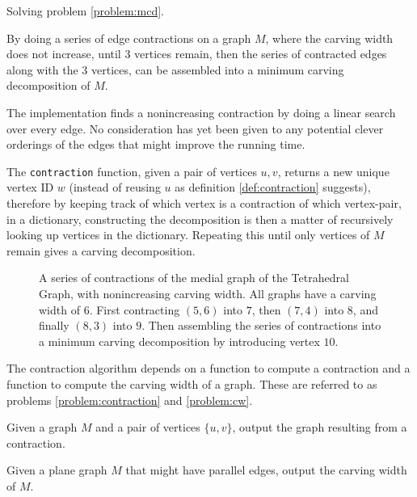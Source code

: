 \documentclass{article}
\begin{document}
		Solving problem \ref{problem:mcd}.

		By doing a series of edge contractions on a graph $M$, where the carving width does not increase, until 3 vertices remain, then the series of contracted edges along with the 3 vertices, can be assembled into a minimum carving decomposition of $M$.

		The implementation finds a nonincreasing contraction by doing a linear search over every edge. No consideration has yet been given to any potential clever orderings of the edges that might improve the running time.

		The \texttt{contraction} function, given a pair of vertices $u,v$, returns a new unique vertex ID $w$ (instead of reusing $u$ as definition \ref{def:contraction} suggests), therefore by keeping track of which vertex is a contraction of which vertex-pair, in a dictionary, constructing the decomposition is then a matter of recursively looking up vertices in the dictionary. Repeating this until only vertices of $M$ remain gives a carving decomposition.


		\begin{figure}[H]
			\centering
			
			
			
			
			
			\caption{A series of contractions of the medial graph of the Tetrahedral Graph, with nonincreasing carving width. All graphs have a carving width of $6$. First contracting $(5,6)$ into $7$, then $(7,4)$ into $8$, and finally $(8,3)$ into $9$. Then assembling the series of contractions into a minimum carving decomposition by introducing vertex $10$.}
			\label{fig:m}
		\end{figure}

		The contraction algorithm depends on a function to compute a contraction and a function to compute the carving width of a graph. These are referred to as problems \ref{problem:contraction} and \ref{problem:cw}.

		\begin{problem}\label{problem:contraction}
			Given a graph $M$ and a pair of vertices $\{u, v\}$, output the graph resulting from a contraction.
		\end{problem}

		\begin{problem}\label{problem:cw}
			Given a plane graph $M$ that might have parallel edges, output the carving width of $M$.
		\end{problem}
\end{document}
